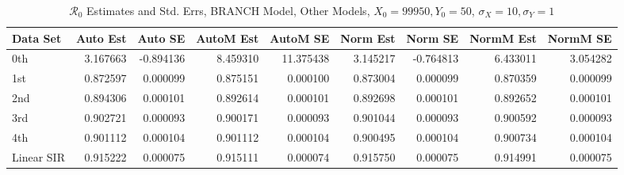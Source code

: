 \documentclass[12pt]{article}
\newcommand{\rr}{\ensuremath{\mathcal{R}_0}}
\begin{document}
\begin{table}[H]
	
	\caption{$\rr$ Estimates and Std. Errs, BRANCH Model,
		Other Models, $X_0 = 99950, Y_0 = 50$, 
		$\sigma_X = 10, \sigma_Y = 1$}
	\begin{footnotesize}
		\hskip -1cm
		\begin{tabular}{l|r|r|r|r|r|r|r|r}
			\hline
			Data Set & Auto Est & Auto SE & AutoM Est & AutoM SE & Norm Est & Norm SE & NormM Est & NormM SE\\
			\hline
			0th & 3.167663 & -0.894136 & 8.459310 & 11.375438 & 3.145217 & -0.764813 & 6.433011 & 3.054282\\
			\hline
			1st & 0.872597 & 0.000099 & 0.875151 & 0.000100 & 0.873004 & 0.000099 & 0.870359 & 0.000099\\
			\hline
			2nd & 0.894306 & 0.000101 & 0.892614 & 0.000101 & 0.892698 & 0.000101 & 0.892652 & 0.000101\\
			\hline
			3rd & 0.902721 & 0.000093 & 0.900171 & 0.000093 & 0.901044 & 0.000093 & 0.900592 & 0.000093\\
			\hline
			4th & 0.901112 & 0.000104 & 0.901112 & 0.000104 & 0.900495 & 0.000104 & 0.900734 & 0.000104\\
			\hline
			Linear SIR & 0.915222 & 0.000075 & 0.915111 & 0.000074 & 0.915750 & 0.000075 & 0.914991 & 0.000075\\
			\hline
		\end{tabular}
	\end{footnotesize}
\end{table}
\end{document}
